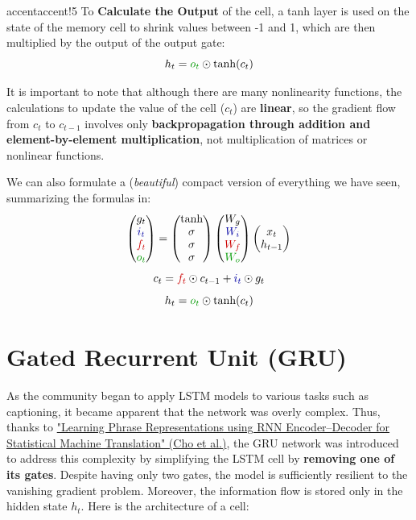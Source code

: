 \begin{remark}{accent}{accent!5}
To \textbf{Calculate the Output} of the cell, a tanh layer is used on the state of the memory cell to shrink values between -1 and 1, which are then multiplied by the output of the output gate:
$$h_t = \textcolor{mygreen}{o_t} \odot \text{tanh}(c_t) $$
\end{remark}

It is important to note that although there are many nonlinearity functions, the calculations to update the value of the cell ($c_t$) are \textbf{linear}, so the gradient flow from $c_t$ to $c_{t-1}$ involves only \textbf{backpropagation through addition and element-by-element multiplication}, not multiplication of matrices or nonlinear functions.

We can also formulate a (\textit{beautiful}) compact version of everything we have seen, summarizing the formulas in:
$$
\setlength{\arraycolsep}{5pt}
\renewcommand{\arraystretch}{0.95}
\begin{pmatrix}
g_t \\
\textcolor{mybluee}{i_t} \\
\textcolor{myred}{f_t} \\
\textcolor{mygreen}{o_t} 
\end{pmatrix} = 
\begin{pmatrix}
\text{tanh} \\
\sigma \\
\sigma \\
\sigma 
\end{pmatrix}
\begin{pmatrix}
W_g \\
\textcolor{mybluee}{W_i} \\
\textcolor{myred}{W_f} \\
\textcolor{mygreen}{W_o}
\end{pmatrix}
\begin{pmatrix}
x_t \\
h_{t-1}
\end{pmatrix}
$$
$$c_t = \textcolor{myred}{f_t} \odot c_{t-1} + \textcolor{mybluee}{i_t} \odot g_t $$
$$h_t = \textcolor{mygreen}{o_t} \odot \text{tanh}(c_t) $$

\section{Gated Recurrent Unit (GRU)}
As the community began to apply LSTM models to various tasks such as captioning, it became apparent that the network was overly complex. Thus, thanks to \href{https://arxiv.org/pdf/1406.1078}{"Learning Phrase Representations using RNN Encoder–Decoder
for Statistical Machine Translation" (Cho et al.)}, the GRU network was introduced to address this complexity by simplifying the LSTM cell by \textbf{removing one of its gates}. Despite having only two gates, the model is sufficiently resilient to the vanishing gradient problem. Moreover, the information flow is stored only in the hidden state $h_t$. Here is the architecture of a cell:

